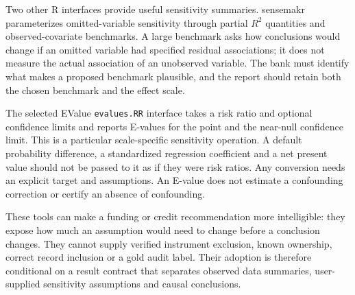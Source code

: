 Two other R interfaces provide useful sensitivity summaries. sensemakr
parameterizes omitted-variable sensitivity through partial \(R^2\) quantities
and observed-covariate benchmarks. A large benchmark asks how conclusions would
change if an omitted variable had specified residual associations; it does not
measure the actual association of an unobserved variable. The bank must identify
what makes a proposed benchmark plausible, and the report should retain both
the chosen benchmark and the effect scale. \citep{v12_sw_sensemakr}

The selected EValue \texttt{evalues.RR} interface takes a risk ratio and optional
confidence limits and reports E-values for the point and the near-null confidence
limit. This is a particular scale-specific sensitivity operation. A default
probability difference, a standardized regression coefficient and a net present
value should not be passed to it as if they were risk ratios. Any conversion
needs an explicit target and assumptions. An E-value does not estimate a
confounding correction or certify an absence of confounding. \citep{v12_sw_evalue}

These tools can make a funding or credit recommendation more intelligible:
they expose how much an assumption would need to change before a conclusion
changes. They cannot supply verified instrument exclusion, known ownership,
correct record inclusion or a gold audit label. Their adoption is therefore
conditional on a result contract that separates observed data summaries,
user-supplied sensitivity assumptions and causal conclusions.

